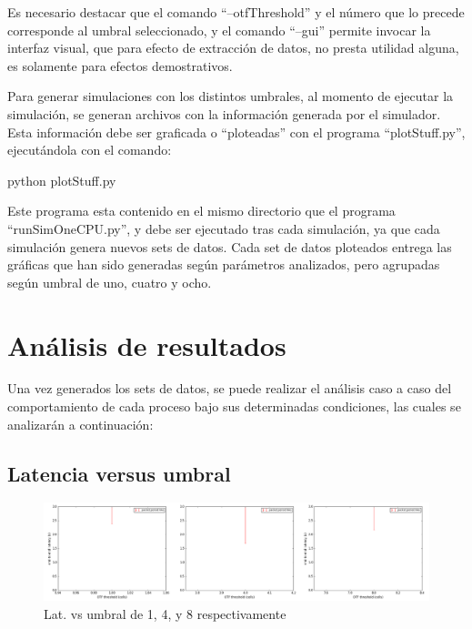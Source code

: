 Es necesario destacar que el comando ``--otfThreshold'' y el número que lo precede corresponde al umbral seleccionado, y el comando ``--gui'' permite invocar la interfaz visual, que para efecto de extracción de datos, no presta utilidad alguna, es solamente para efectos demostrativos.

Para generar simulaciones con los distintos umbrales, al momento de ejecutar la simulación, se generan archivos con la información generada por el simulador. Esta información debe ser graficada o ``ploteadas'' con el programa ``plotStuff.py'', ejecutándola con el comando:

\begin{ttfamily}
    python plotStuff.py

\end{ttfamily}

Este programa esta contenido en el mismo directorio que el programa ``runSimOneCPU.py'', y debe ser ejecutado tras cada simulación, ya que cada simulación genera nuevos sets de datos. Cada set de datos ploteados entrega las gráficas que han sido generadas según parámetros analizados, pero agrupadas según umbral de uno, cuatro y ocho.



\newpage


\section{Análisis de resultados}


Una vez generados los sets de datos, se puede realizar el análisis caso a caso del comportamiento de cada proceso bajo sus determinadas condiciones, las cuales se analizarán a continuación:

\subsection{Latencia versus umbral}

        \begin{figure}[h]
        \graphicspath{ {imagenes/agrupadas/} }
        \centering
        \includegraphics[width=1.0\textwidth]{lat_vs_threshold.png}
        \caption{Lat. vs umbral de 1, 4, y 8 respectivamente}
        \label{latvumbral1}
        \end{figure}


